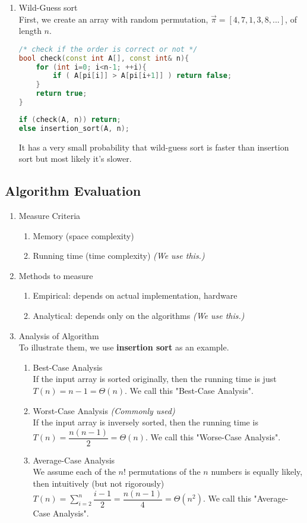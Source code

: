 \documentclass[11pt]{article}
\begin{document}
\begin{enumerate}
\begin{enumerate}
\begin{enumerate}
\item Wild-Guess sort\\
First, we create an array with random permutation, $\vec{\pi}= [4, 7, 1, 3, 8, ...]$, of length $n$.
\begin{lstlisting}[language=C++]
/* check if the order is correct or not */
bool check(const int A[], const int& n){
	for (int i=0; i<n-1; ++i){
		if ( A[pi[i]] > A[pi[i+1]] ) return false;
	}
	return true;
}
\end{lstlisting}
\begin{lstlisting}[language=C++]
if (check(A, n)) return;
else insertion_sort(A, n);
\end{lstlisting}
It has a very small probability that wild-guess sort is faster than insertion sort but most likely it's slower.
\end{enumerate}
\end{enumerate}
\end{enumerate}

\subsection{Algorithm Evaluation}
\begin{enumerate}
\item Measure Criteria
\begin{enumerate}
\item Memory (space complexity)
\item Running time (time complexity) \textit{(We use this.)}
\end{enumerate}
\item Methods to measure
\begin{enumerate}
\item Empirical: depends on actual implementation, hardware
\item Analytical: depends only on the algorithms \textit{(We use this.)}
\end{enumerate}
\item Analysis of Algorithm\\
To illustrate them, we use \textbf{insertion sort} as an example.
\begin{enumerate}
\item Best-Case Analysis\\
If the input array is sorted originally, then the running time is just $T(n) = n -1 = \Theta (n)$. We call this "Best-Case Analysis".
\item Worst-Case Analysis \textit{(Commonly used)}\\
If the input array is inversely sorted, then the running time is $T(n) = \dfrac{n(n-1)}{2} = \Theta (n)$. We call this "Worse-Case Analysis".
\item Average-Case Analysis\\
We assume each of the $n!$ permutations of the $n$ numbers is equally likely, then intuitively (but not rigorously) $T(n) = \sum_{i=2}^{n} \dfrac{i-1}{2} = \dfrac{n (n-1)}{4} = \Theta (n^2)$. We call this "Average-Case Analysis".
\end{enumerate}
\end{enumerate}
\end{document}

